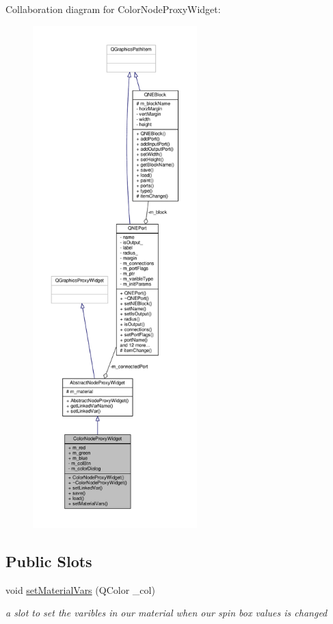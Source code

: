 Collaboration diagram for Color\-Node\-Proxy\-Widget\-:
\nopagebreak
\begin{figure}[H]
\begin{center}
\leavevmode
\includegraphics[height=550pt]{class_color_node_proxy_widget__coll__graph}
\end{center}
\end{figure}
\subsection*{Public Slots}
\begin{DoxyCompactItemize}
\item 
void \hyperlink{class_color_node_proxy_widget_add07d21a9e816205e9771214ec2fa6f4}{set\-Material\-Vars} (Q\-Color \-\_\-col)
\begin{DoxyCompactList}\small\item\em a slot to set the varibles in our material when our spin box values is changed \end{DoxyCompactList}\end{DoxyCompactItemize}

